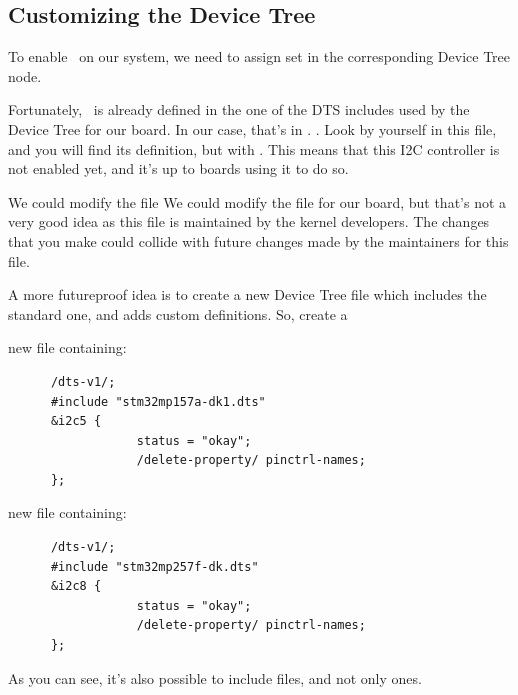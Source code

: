 \subsection{Customizing the Device Tree}

To enable \busname\ on our system, we need to assign set  in the corresponding Device Tree node.

Fortunately, \busname\ is already defined in the one of the DTS includes
used by the Device Tree for our board. In our case, that's in
\if{}
      . 
\fi
\if{}
      .
\fi
Look by yourself in this
file, and you will find its definition, but with . This means that this I2C controller is not enabled yet,
and it's up to boards using it to do so.

\if{}
      We could modify the  file
\fi
\if{}
      We could modify the  file
\fi
for our board, but that's not a very good idea as this file is
maintained by the kernel developers. The changes that you make could
collide with future changes made by the maintainers for this file.

A more futureproof idea is to create a new Device Tree file which
includes the standard one, and adds custom definitions. So, create a

\if{}
      new  file containing:
      \begin{verbatim}
      /dts-v1/;
      #include "stm32mp157a-dk1.dts"
      &i2c5 {
                  status = "okay";
                  /delete-property/ pinctrl-names;
      };
      \end{verbatim}
\fi
\if{}
      new  file containing:
      \begin{verbatim}
      /dts-v1/;
      #include "stm32mp257f-dk.dts"
      &i2c8 {
                  status = "okay";
                  /delete-property/ pinctrl-names;
      };
      \end{verbatim}
\fi

As you can see, it's also possible to include  files, and not
only  ones.

